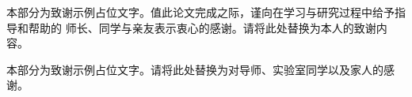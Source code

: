 \begin{acknowledgement}
本部分为致谢示例占位文字。值此论文完成之际，谨向在学习与研究过程中给予指导和帮助的
师长、同学与亲友表示衷心的感谢。请将此处替换为本人的致谢内容。

本部分为致谢示例占位文字。请将此处替换为对导师、实验室同学以及家人的感谢。
\end{acknowledgement}

